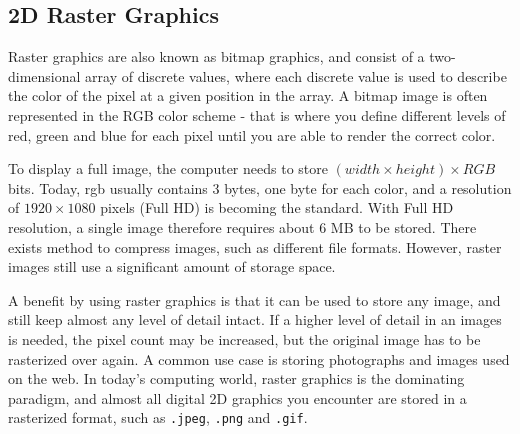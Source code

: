 \subsection{2D Raster Graphics}
Raster graphics are also known as bitmap graphics, and consist of a two-dimensional array of discrete values, where each discrete value is used to describe the color of the pixel at a given position in the array.
A bitmap image is often represented in the RGB color scheme - that is where you define different levels of red, green and blue for each pixel until you are able to render the correct color.

To display a full image, the computer needs to store \( (width \times height) \times RGB \) bits.
Today, \gls{rgb} usually contains 3 bytes, one byte for each color, and a resolution of \(1920 \times 1080\) pixels (Full HD) is becoming the standard.
With Full HD resolution, a single image therefore requires about 6 MB to be stored.
There exists method to compress images, such as different file formats.
However, raster images still use a significant amount of storage space.

A benefit by using raster graphics is that it can be used to store any image, and still keep almost any level of detail intact.
If a higher level of detail in an images is needed, the pixel count may be increased, but the original image has to be rasterized over again.
A common use case is storing photographs and images used on the web.
In today's computing world, raster graphics is the dominating paradigm, and almost all digital 2D graphics you encounter are stored in a rasterized format, such as \texttt{.jpeg}, \texttt{.png} and \texttt{.gif}.
